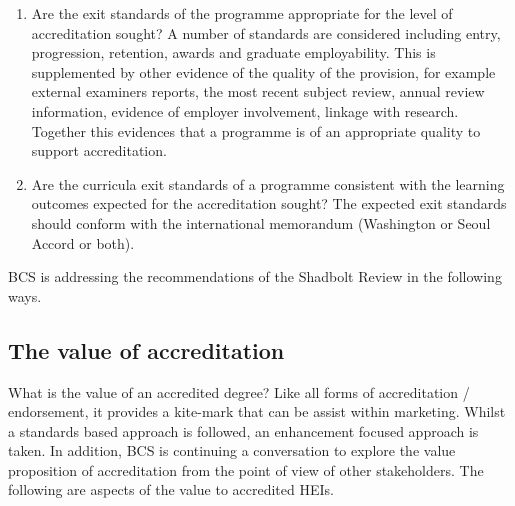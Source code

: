 \documentclass[sigconf]{acmart}
\begin{document}
\begin{enumerate}
    \item Are the exit standards of the programme appropriate for the level of accreditation sought?
     A number of standards are considered including entry, progression, retention, awards and graduate employability.  This is supplemented by other evidence of the quality of the provision, for example external examiners reports, the most recent subject review, annual review information, evidence of employer involvement, linkage with research. Together this evidences that a programme is of an appropriate quality to support accreditation.
    \item Are the curricula exit standards of a programme consistent with the learning outcomes expected for the accreditation sought? The expected exit standards should conform with the international memorandum (Washington or Seoul Accord or both). 
\end{enumerate}

BCS is addressing the recommendations of the Shadbolt Review in the following ways.

\subsection{The value of accreditation}
What is the value of an accredited degree?  Like all forms of accreditation / endorsement, it provides a kite-mark that can be assist within marketing. Whilst a standards based approach is followed, an enhancement focused approach is taken.  In addition, BCS is continuing a conversation to explore the value proposition of accreditation from the point of view of other stakeholders. The following are aspects of the value to accredited HEIs.
\end{document}
